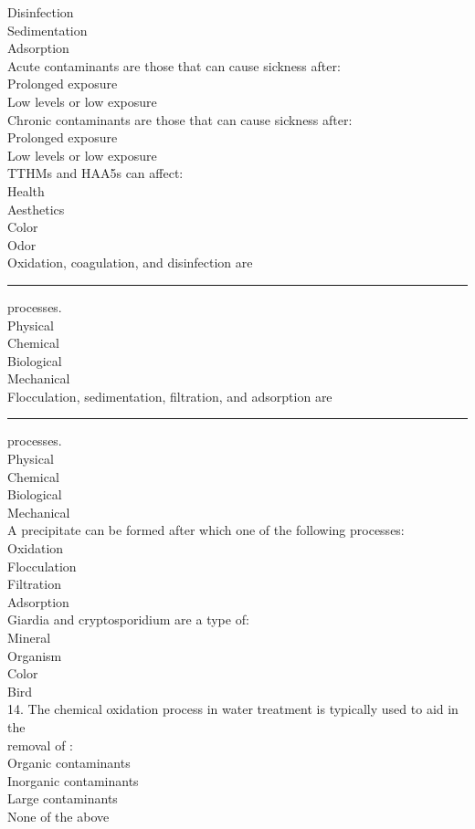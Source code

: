 Disinfection\\
Sedimentation\\
Adsorption\\
Acute contaminants are those that can cause sickness after:\\
Prolonged exposure\\
Low levels or low exposure\\
Chronic contaminants are those that can cause sickness after:\\
Prolonged exposure\\
Low levels or low exposure\\
TTHMs and HAA5s can affect:\\
Health\\
Aesthetics\\
Color\\
Odor\\
Oxidation, coagulation, and disinfection are \rule{1cm}{0.5pt}  processes.\\
Physical\\
Chemical\\
Biological\\
Mechanical\\
Flocculation, sedimentation, filtration, and adsorption are \rule{1cm}{0.5pt} processes.\\
Physical\\
Chemical\\
Biological\\
Mechanical\\
A precipitate can be formed after which one of the following processes:\\
Oxidation\\
Flocculation\\
Filtration\\
Adsorption\\
Giardia and cryptosporidium are a type of:\\
Mineral\\
Organism\\
Color\\
Bird\\
14. The chemical oxidation process in water treatment is typically used to aid in the\\
removal of :\\
Organic contaminants\\
Inorganic contaminants\\
Large contaminants\\
None of the above\\

